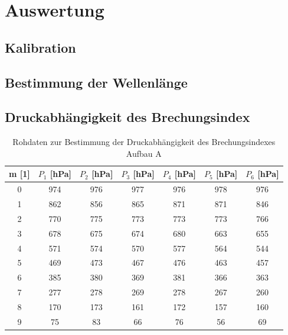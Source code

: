 \documentclass[12pt,a4paper]{article}
\begin{document}
\section{Auswertung}

\subsection{Kalibration}

\subsection{Bestimmung der Wellenlänge}

\subsection{Druckabhängigkeit des Brechungsindex}

\begin{table}
\begin{center}
\begin{tabular}{|c|c|c|c|c|c|c|}
\hline 
m [1] & $P_1$ [hPa] & $P_2$ [hPa] & $P_3$ [hPa] & $P_4$ [hPa] & $P_5$ [hPa] & $P_6$ [hPa] \\ 
\hline 
0 & 974 & 976 & 977 & 976 & 978 & 976 \\ 
\hline 
1 & 862 & 856 & 865 & 871 & 871 & 846 \\ 
\hline 
2 & 770 & 775 & 773 & 773 & 773 & 766 \\ 
\hline 
3 & 678 & 675 & 674 & 680 & 663 & 655 \\ 
\hline 
4 & 571 & 574 & 570 & 577 & 564 & 544 \\ 
\hline 
5 & 469 & 473 & 467 & 476 & 463 & 457 \\ 
\hline 
6 & 385 & 380 & 369 & 381 & 366 & 363 \\ 
\hline 
7 & 277 & 278 & 269 & 278 & 267 & 260 \\ 
\hline 
8 & 170 & 173 & 161 & 172 & 157 & 160 \\ 
\hline 
9 & 75 & 83 & 66 & 76 & 56 & 69 \\ 
\hline 
\end{tabular} 
\caption{Rohdaten zur Bestimmung der Druckabhängigkeit des Brechungsindexes Aufbau A}
\label{tab:Rohdaten_Druck_A}
\end{center}
\end{table}
\end{document}
